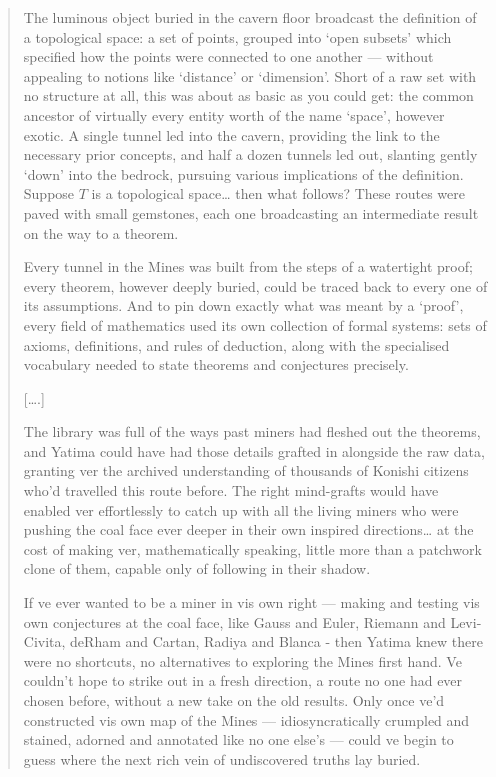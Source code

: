 \documentclass{article}
\begin{document}
\begin{quote}
The luminous object buried in the cavern floor broadcast the definition
of a topological space: a set of points, grouped into `open subsets'
which specified how the points were connected to one another --- without
appealing to notions like `distance' or `dimension'. Short of a raw set
with no structure at all, this was about as basic as you could get: the
common ancestor of virtually every entity worth of the name `space',
however exotic. A single tunnel led into the cavern, providing the link
to the necessary prior concepts, and half a dozen tunnels led out,
slanting gently `down' into the bedrock, pursuing various implications
of the definition. Suppose \(T\) is a topological space\ldots{} then
what follows? These routes were paved with small gemstones, each one
broadcasting an intermediate result on the way to a theorem.

Every tunnel in the Mines was built from the steps of a watertight
proof; every theorem, however deeply buried, could be traced back to
every one of its assumptions. And to pin down exactly what was meant by
a `proof', every field of mathematics used its own collection of formal
systems: sets of axioms, definitions, and rules of deduction, along with
the specialised vocabulary needed to state theorems and conjectures
precisely.

{[}\ldots.{]}

The library was full of the ways past miners had fleshed out the
theorems, and Yatima could have had those details grafted in alongside
the raw data, granting ver the archived understanding of thousands of
Konishi citizens who'd travelled this route before. The right
mind-grafts would have enabled ver effortlessly to catch up with all the
living miners who were pushing the coal face ever deeper in their own
inspired directions\ldots{} at the cost of making ver, mathematically
speaking, little more than a patchwork clone of them, capable only of
following in their shadow.

If ve ever wanted to be a miner in vis own right --- making and testing
vis own conjectures at the coal face, like Gauss and Euler, Riemann and
Levi-Civita, deRham and Cartan, Radiya and Blanca - then Yatima knew
there were no shortcuts, no alternatives to exploring the Mines first
hand. Ve couldn't hope to strike out in a fresh direction, a route no
one had ever chosen before, without a new take on the old results. Only
once ve'd constructed vis own map of the Mines --- idiosyncratically
crumpled and stained, adorned and annotated like no one else's --- could
ve begin to guess where the next rich vein of undiscovered truths lay
buried.
\end{quote}
\end{document}
